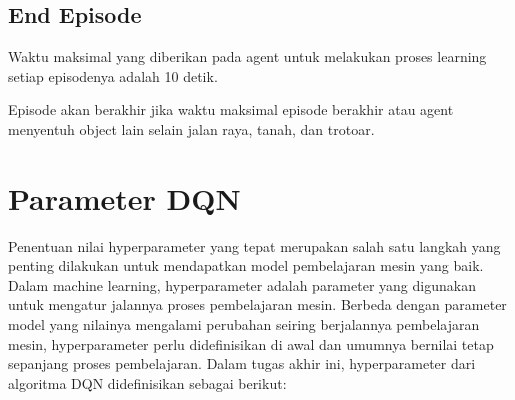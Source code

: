 \subsection{End Episode}
\label{sec:end_episode}
Waktu maksimal yang diberikan pada agent untuk melakukan proses learning setiap episodenya adalah 10 detik.

Episode akan berakhir jika waktu maksimal episode berakhir atau agent menyentuh object lain selain jalan raya, tanah, dan trotoar.

\section{Parameter DQN}
\label{sec:parameter_dqn}
Penentuan nilai hyperparameter yang tepat merupakan salah satu langkah yang penting dilakukan untuk mendapatkan model pembelajaran mesin yang baik. Dalam machine learning, hyperparameter adalah parameter yang digunakan untuk mengatur jalannya proses pembelajaran mesin. Berbeda dengan parameter model yang nilainya mengalami perubahan seiring berjalannya pembelajaran mesin, hyperparameter perlu didefinisikan di awal dan umumnya bernilai tetap sepanjang proses pembelajaran. Dalam tugas akhir ini, hyperparameter dari algoritma DQN didefinisikan sebagai berikut:

